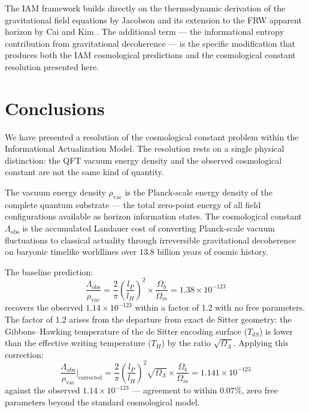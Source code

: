 \documentclass[12pt,a4paper]{article}
\begin{document}
The IAM framework builds directly on the thermodynamic derivation of the
gravitational field equations by Jacobson \citep{jacobson1995} and its
extension to the FRW apparent horizon by Cai and Kim \citep{caikim2005}.
The additional term — the informational entropy contribution from
gravitational decoherence — is the specific modification that produces
both the IAM cosmological predictions \citep{mahaffey2026} and the
cosmological constant resolution presented here.

\section{Conclusions}
\label{sec:conclusions}

We have presented a resolution of the cosmological constant problem
within the Informational Actualization Model. The resolution rests on a
single physical distinction: the QFT vacuum energy density and the
observed cosmological constant are not the same kind of quantity.

The vacuum energy density $\rho_\mathrm{vac}$ is the Planck-scale
energy density of the complete quantum substrate — the total
zero-point energy of all field configurations available as horizon
information states. The cosmological constant $\Lambda_\mathrm{obs}$
is the accumulated Landauer cost of converting Planck-scale vacuum
fluctuations to classical actuality through irreversible gravitational
decoherence on baryonic timelike worldlines over 13.8 billion years of
cosmic history.

The baseline prediction:
\begin{equation}
\frac{\Lambda_\mathrm{obs}}{\rho_\mathrm{vac}} =
\frac{2}{\pi}\left(\frac{l_P}{l_H}\right)^2 \times \frac{\Omega_b}{\Omega_m}
= 1.38 \times 10^{-123}
\end{equation}
recovers the observed $1.14 \times 10^{-123}$ within a factor of 1.2
with no free parameters. The factor of 1.2 arises from the departure
from exact de Sitter geometry: the Gibbons--Hawking temperature of the
de Sitter encoding surface ($T_{dS}$) is lower than the effective writing
temperature ($T_H$) by the ratio $\sqrt{\Omega_\Lambda}$. Applying this
correction:
\begin{equation}
\frac{\Lambda_\mathrm{obs}}{\rho_\mathrm{vac}}\bigg|_\mathrm{corrected} =
\frac{2}{\pi}\left(\frac{l_P}{l_H}\right)^2 \sqrt{\Omega_\Lambda}
\times \frac{\Omega_b}{\Omega_m}
= 1.141 \times 10^{-123}
\end{equation}
against the observed $1.14 \times 10^{-123}$ — agreement to within
$0.07\%$, zero free parameters beyond the standard cosmological model.
\end{document}
